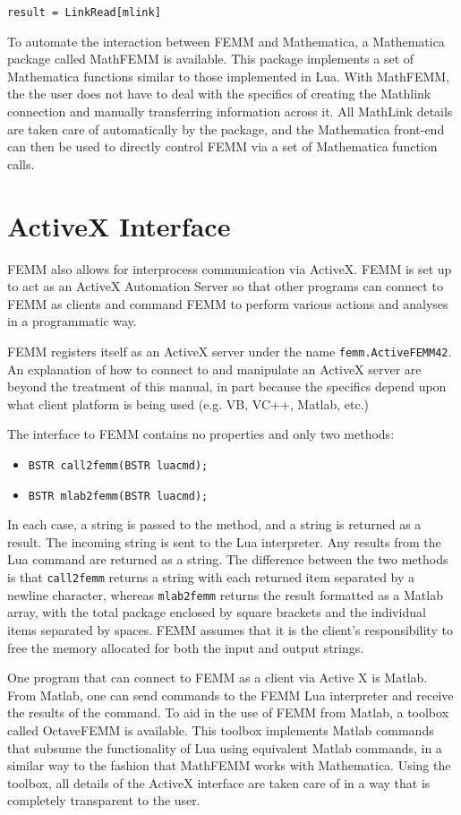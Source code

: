 \verb+result = LinkRead[mlink]+

To automate the interaction between FEMM and Mathematica, a Mathematica package called MathFEMM is available.
This package implements a set of Mathematica functions similar to those implemented in Lua.  With MathFEMM, the
the user does not have to deal with the specifics of creating the Mathlink connection and manually transferring
information across it.  All MathLink details are taken care of automatically by the package, and the Mathematica
front-end can then be used to directly control FEMM via a set of Mathematica function calls.

\chapter{ActiveX Interface}

FEMM also allows for interprocess communication via ActiveX.  FEMM is set up to act as an ActiveX Automation Server
so that other programs can connect to FEMM as clients and command FEMM to perform various actions and analyses in
a programmatic way.

FEMM registers itself as an ActiveX server under the name {\tt femm.ActiveFEMM42}. An explanation of how to connect to
and manipulate an ActiveX server are beyond the treatment of this manual, in part because the specifics depend upon
what client platform is being used (e.g. VB, VC++, Matlab, etc.)

The interface to FEMM contains no properties and only two methods:

\begin{itemize}
\item {\tt BSTR call2femm(BSTR luacmd);}
\item {\tt BSTR mlab2femm(BSTR luacmd);}
\end{itemize}

In each case, a string is passed to the method, and a string is returned as a result.  The incoming string is sent
to the Lua interpreter.  Any results from the Lua command are returned as a string. The difference between the two
methods is that {\tt call2femm} returns a string with each returned item separated by a newline character, whereas
{\tt mlab2femm} returns the result formatted as a Matlab array, with the total package enclosed by square brackets
and the individual items separated by spaces. FEMM assumes that it is the client's responsibility to free the memory
allocated for both the input and output strings.

One program that can connect to FEMM as a client via Active X is Matlab. From Matlab, one can send
commands to the FEMM Lua interpreter and receive the results of the command.  To aid in the use of FEMM from
Matlab, a toolbox called OctaveFEMM is available. This toolbox implements Matlab commands that
subsume the functionality of Lua using equivalent Matlab commands, in a similar way to the fashion that MathFEMM works
with Mathematica.  Using the toolbox, all details of the ActiveX interface are taken care of in a way that is
completely transparent to the user.
